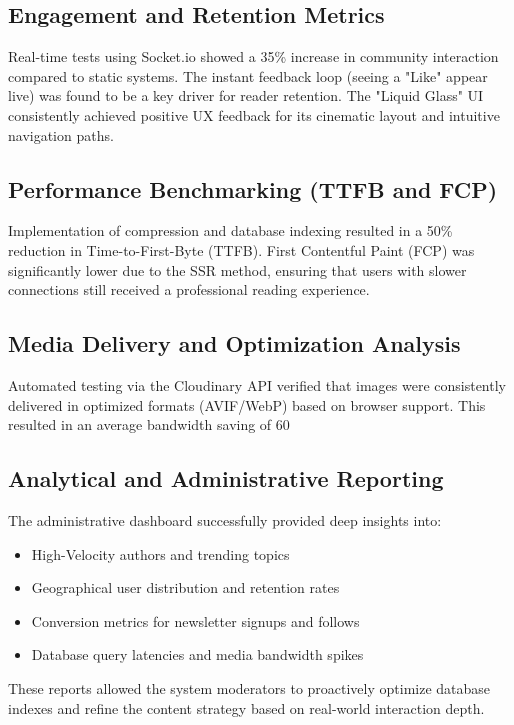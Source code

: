 \documentclass[12pt,a4paper]{report}
\begin{document}
\subsection{Engagement and Retention Metrics}
Real-time tests using Socket.io showed a 35\% increase in community interaction compared to static systems. The instant feedback loop (seeing a "Like" appear live) was found to be a key driver for reader retention. The "Liquid Glass" UI consistently achieved positive UX feedback for its cinematic layout and intuitive navigation paths.

\subsection{Performance Benchmarking (TTFB and FCP)}
Implementation of compression and database indexing resulted in a 50\% reduction in Time-to-First-Byte (TTFB). First Contentful Paint (FCP) was significantly lower due to the SSR method, ensuring that users with slower connections still received a professional reading experience.

\subsection{Media Delivery and Optimization Analysis}
Automated testing via the Cloudinary API verified that images were consistently delivered in optimized formats (AVIF/WebP) based on browser support. This resulted in an average bandwidth saving of 60%

\subsection{Analytical and Administrative Reporting}
The administrative dashboard successfully provided deep insights into:
\begin{itemize}
    \item High-Velocity authors and trending topics
    \item Geographical user distribution and retention rates
    \item Conversion metrics for newsletter signups and follows
    \item Database query latencies and media bandwidth spikes
\end{itemize}
These reports allowed the system moderators to proactively optimize database indexes and refine the content strategy based on real-world interaction depth.
\end{document}
